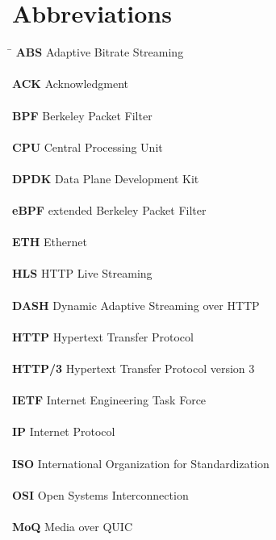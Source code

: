 \chapter*{Abbreviations}\label{chap:abbreviations}

\begin{tabbing}
    \hspace{5cm} \= \kill %
    \textbf{ABS} \> Adaptive Bitrate Streaming
    \\\\\textbf{ACK} \> Acknowledgment
    \\\\\textbf{BPF} \> Berkeley Packet Filter
    \\\\\textbf{CPU} \> Central Processing Unit
    \\\\\textbf{DPDK} \> Data Plane Development Kit
    \\\\\textbf{eBPF} \> extended Berkeley Packet Filter
    \\\\\textbf{ETH} \> Ethernet
    \\\\\textbf{HLS} \> HTTP Live Streaming
    \\\\\textbf{DASH} \> Dynamic Adaptive Streaming over HTTP
    \\\\\textbf{HTTP} \> Hypertext Transfer Protocol
    \\\\\textbf{HTTP/3} \> Hypertext Transfer Protocol version 3
    \\\\\textbf{IETF} \> Internet Engineering Task Force
    \\\\\textbf{IP} \> Internet Protocol
    \\\\\textbf{ISO} \>International Organization for Standardization
    \\\\\textbf{OSI} \> Open Systems Interconnection
    \\\\\textbf{MoQ} \> Media over QUIC

\end{tabbing}
